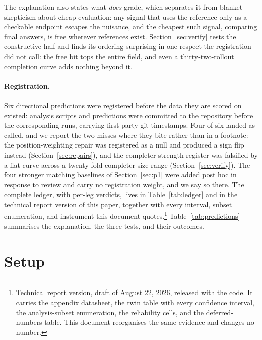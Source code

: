 \documentclass[11pt]{article}
\begin{document}
The explanation also states what \emph{does} grade, which separates it from blanket skepticism about cheap evaluation: any signal that uses the reference only as a checkable endpoint escapes the nuisance, and the cheapest such signal, comparing final answers, is free wherever references exist.
Section~\ref{sec:verify} tests the constructive half and finds its ordering surprising in one respect the registration did not call: the free bit tops the entire field, and even a thirty-two-rollout completion curve adds nothing beyond it.

\paragraph{Registration.}
Six directional predictions were registered before the data they are scored on existed: analysis scripts and predictions were committed to the repository before the corresponding runs, carrying first-party git timestamps.
Four of six landed as called, and we report the two misses where they bite rather than in a footnote: the position-weighting repair was registered as a null and produced a sign flip instead (Section~\ref{sec:repairs}), and the completer-strength register was falsified by a flat curve across a twenty-fold completer-size range (Section~\ref{sec:verify}).
The four stronger matching baselines of Section~\ref{sec:p1} were added post hoc in response to review and carry no registration weight, and we say so there.
The complete ledger, with per-leg verdicts, lives in Table~\ref{tab:ledger} and in the technical report version of this paper, together with every interval, subset enumeration, and instrument this document quotes.\footnote{Technical report version, draft of August 22, 2026, released with the code. It carries the appendix datasheet, the twin table with every confidence interval, the analysis-subset enumeration, the reliability cells, and the deferred-numbers table. This document reorganises the same evidence and changes no number.}
Table~\ref{tab:predictions} summarises the explanation, the three tests, and their outcomes.

\section{Setup}
\label{sec:setup}
\end{document}
